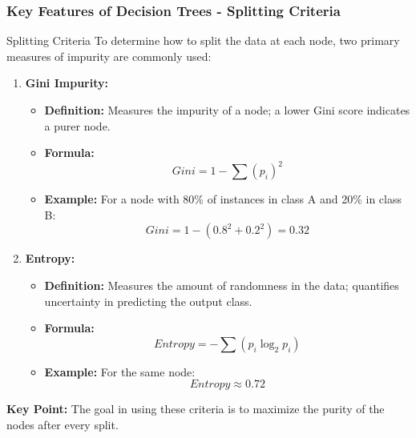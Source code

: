 \documentclass{beamer}
\begin{document}
\begin{frame}[fragile]
    \frametitle{Key Features of Decision Trees - Splitting Criteria}
    \begin{block}{Splitting Criteria}
        To determine how to split the data at each node, two primary measures of impurity are commonly used:
        \begin{enumerate}
            \item \textbf{Gini Impurity:}
                \begin{itemize}
                    \item \textbf{Definition:} Measures the impurity of a node; a lower Gini score indicates a purer node.
                    \item \textbf{Formula:}
                    \begin{equation}
                        Gini = 1 - \sum (p_i)^2
                    \end{equation}
                    \item \textbf{Example:} For a node with 80\% of instances in class A and 20\% in class B:
                    \begin{equation}
                        Gini = 1 - (0.8^2 + 0.2^2) = 0.32
                    \end{equation}
                \end{itemize}
            \item \textbf{Entropy:}
                \begin{itemize}
                    \item \textbf{Definition:} Measures the amount of randomness in the data; quantifies uncertainty in predicting the output class.
                    \item \textbf{Formula:}
                    \begin{equation}
                        Entropy = -\sum (p_i \log_2 p_i)
                    \end{equation}
                    \item \textbf{Example:} For the same node:
                    \begin{equation}
                        Entropy \approx 0.72
                    \end{equation}
                \end{itemize}
        \end{enumerate}
        \textbf{Key Point:} The goal in using these criteria is to maximize the purity of the nodes after every split.
    \end{block}
\end{frame}
\end{document}
